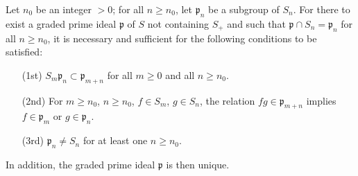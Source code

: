 \begin{proposition}[2.1.9]
\label{II.2.1.9}
Let $n_0$ be an integer $>0$;
for all $n\geq n_0$, let $\mathfrak{p}_n$ be a subgroup of $S_n$.
For there to exist a graded prime ideal $\mathfrak{p}$ of $S$ not containing $S_+$ and such that $\mathfrak{p}\cap S_n=\mathfrak{p}_n$ for all $n\geq n_0$, it is necessary and sufficient for the following conditions to be satisfied:
\begin{enumerate}
  \item[{\rm(1st)}] $S_m\mathfrak{p}_n\subset\mathfrak{p}_{m+n}$ for all $m\geq 0$ and all $n\geq n_0$.
  \item[{\rm(2nd)}] For $m\geq n_0$, $n\geq n_0$, $f\in S_m$, $g\in S_n$, the relation $fg\in\mathfrak{p}_{m+n}$ implies $f\in\mathfrak{p}_m$ or $g\in\mathfrak{p}_n$.
  \item[{\rm(3rd)}] $\mathfrak{p}_n\neq S_n$ for at least one $n\geq n_0$.
\end{enumerate}
In addition, the graded prime ideal $\mathfrak{p}$ is then unique.
\end{proposition}

